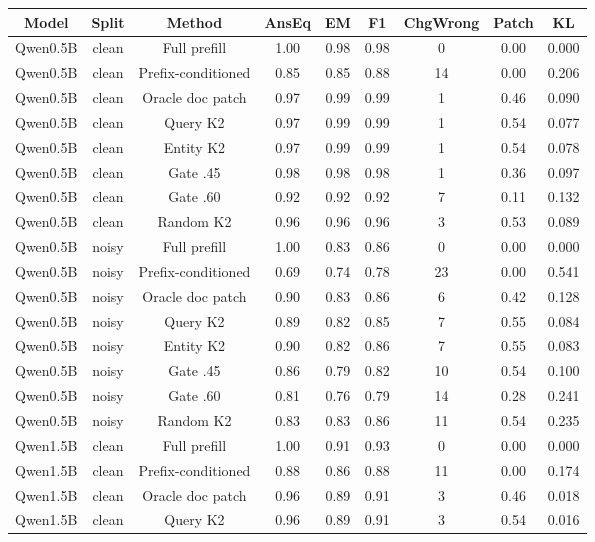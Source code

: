 \begin{table}[t]
\centering
\footnotesize
\begin{adjustbox}{max width=\textwidth}
\begin{tabular}{ccccccccc}
\toprule
Model & Split & Method & AnsEq & EM & F1 & ChgWrong & Patch & KL \\
\midrule
Qwen0.5B & clean & Full prefill & 1.00 & 0.98 & 0.98 & 0 & 0.00 & 0.000 \\
Qwen0.5B & clean & Prefix-conditioned & 0.85 & 0.85 & 0.88 & 14 & 0.00 & 0.206 \\
Qwen0.5B & clean & Oracle doc patch & 0.97 & 0.99 & 0.99 & 1 & 0.46 & 0.090 \\
Qwen0.5B & clean & Query K2 & 0.97 & 0.99 & 0.99 & 1 & 0.54 & 0.077 \\
Qwen0.5B & clean & Entity K2 & 0.97 & 0.99 & 0.99 & 1 & 0.54 & 0.078 \\
Qwen0.5B & clean & Gate .45 & 0.98 & 0.98 & 0.98 & 1 & 0.36 & 0.097 \\
Qwen0.5B & clean & Gate .60 & 0.92 & 0.92 & 0.92 & 7 & 0.11 & 0.132 \\
Qwen0.5B & clean & Random K2 & 0.96 & 0.96 & 0.96 & 3 & 0.53 & 0.089 \\
Qwen0.5B & noisy & Full prefill & 1.00 & 0.83 & 0.86 & 0 & 0.00 & 0.000 \\
Qwen0.5B & noisy & Prefix-conditioned & 0.69 & 0.74 & 0.78 & 23 & 0.00 & 0.541 \\
Qwen0.5B & noisy & Oracle doc patch & 0.90 & 0.83 & 0.86 & 6 & 0.42 & 0.128 \\
Qwen0.5B & noisy & Query K2 & 0.89 & 0.82 & 0.85 & 7 & 0.55 & 0.084 \\
Qwen0.5B & noisy & Entity K2 & 0.90 & 0.82 & 0.86 & 7 & 0.55 & 0.083 \\
Qwen0.5B & noisy & Gate .45 & 0.86 & 0.79 & 0.82 & 10 & 0.54 & 0.100 \\
Qwen0.5B & noisy & Gate .60 & 0.81 & 0.76 & 0.79 & 14 & 0.28 & 0.241 \\
Qwen0.5B & noisy & Random K2 & 0.83 & 0.83 & 0.86 & 11 & 0.54 & 0.235 \\
Qwen1.5B & clean & Full prefill & 1.00 & 0.91 & 0.93 & 0 & 0.00 & 0.000 \\
Qwen1.5B & clean & Prefix-conditioned & 0.88 & 0.86 & 0.88 & 11 & 0.00 & 0.174 \\
Qwen1.5B & clean & Oracle doc patch & 0.96 & 0.89 & 0.91 & 3 & 0.46 & 0.018 \\
Qwen1.5B & clean & Query K2 & 0.96 & 0.89 & 0.91 & 3 & 0.54 & 0.016 \\

\end{tabular}
\end{adjustbox}
\end{table}
